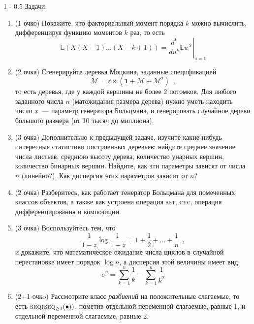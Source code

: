 \documentclass[a5paper]{article}
\makeatletter
\theoremstyle{definition}
\renewcommand{\section}{\@startsection
{section}%
{1}%
{\z@}%
{-\baselineskip}%
{0.5\baselineskip}%
{\centering\large\scshape}} %
\makeatother
\begin{document}
\section{Задачи}
\begin{enumerate}
\item(1 очко) Покажите, что факториальный момент порядка \( k \) можно
вычислить, дифференцируя функцию моментов \( k \) раз, то есть
\begin{equation}
    \mathbb E (X(X - 1) \ldots (X - k + 1))
    = \left.\dfrac{d^k}{du^{k}} \mathbb E u^{X}
\right|_{u=1}
\end{equation}
\item(2 очка) Сгенерируйте деревья Моцкина, заданные спецификацией
\begin{equation}
    \mathcal M = z \times( \boldsymbol 1 + \mathcal M + \mathcal M^2) \enspace ,
\end{equation}
то есть деревья, где у каждой вершины не более 2 потомков. Для любого заданного
числа \( n \) (матожидания размера дерева) нужно уметь находить число \( x
\)~--- параметр генератора Больцмана, и генерировать случайное дерево большого
размера (от 10 тысяч до миллиона).
\item(3 очка) Дополнительно к предыдущей задаче, изучите какие-нибудь интересные
статистики построенных деревьев: найдите среднее значение числа листьев, среднюю
высоту дерева, количество унарных вершин, количество бинарных вершин. Найдите,
как эти параметры зависят от числа \( n \) (линейно?). Как дисперсия этих
параметров зависит от \( n \)?

\item(2 очка) Разберитесь, как работает генератор Больцмана для помеченных
классов объектов, а также как устроена операция \textsc{set},
\textsc{cyc}, операция дифференцирования и композиции.

\item(3 очка) Воспользуйтесь тем, что 
\begin{equation}
    [z^n] \dfrac{1}{1 - z} \log \dfrac{1}{1-z} = 1 + \dfrac12 + \ldots +
\dfrac1n \enspace ,
\end{equation}
и докажите, что математическое ожидание числа циклов в случайной перестановке
имеет порядок \( \log n \), а дисперсия этой величины имеет вид
\begin{equation}
    \sigma^2 = \sum_{k=1}^n \dfrac 1k - \sum_{k=1}^n \dfrac{1}{k^2}
\end{equation}
\item(2+1 очкo) Рассмотрите класс \textit{разбиений} на положительные слагаемые,
то есть  \( \text{\textsc{seq}}(\text{\textsc{seq}}_{\geq 1}(\bullet)) \),
пометив отдельной переменной слагаемые, равные 1, и отдельной переменной
слагаемые, равные 2.


\end{enumerate}
\end{document}
